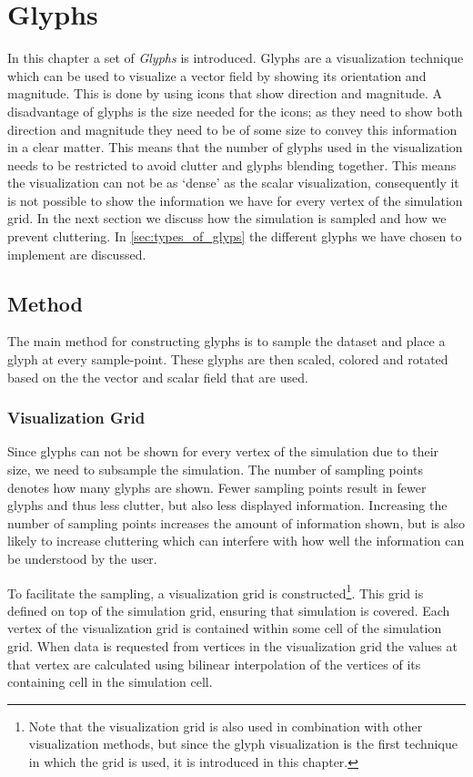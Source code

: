 \chapter{Glyphs} %
\label{cha:glyphs}
In this chapter a set of \emph{Glyphs} is introduced. Glyphs are a visualization technique which can be used to visualize a vector field by showing its orientation and magnitude. This is done by using icons that show direction and magnitude. A disadvantage of glyphs is the size needed for the icons; as they need to show both direction and magnitude they need to be of some size to convey this information in a clear matter. This means that the number of glyphs used in the visualization needs to be restricted to avoid clutter and glyphs blending together. This means the visualization can not be as `dense' as the scalar visualization, consequently it is not possible to show the information we have for every vertex of the simulation grid. In the next section we discuss how the simulation is sampled and how we prevent cluttering. In \cref{sec:types_of_glyps} the different glyphs we have chosen to implement are discussed.

\section{Method} %
\label{sec:method}
The main method for constructing glyphs is to sample the dataset and place a glyph at every sample-point. These glyphs are then scaled, colored and rotated based on the the vector and scalar field that are used.

\subsection{Visualization Grid} %
\label{sub:sampling_grid}
Since glyphs can not be shown for every vertex of the simulation due to their size, we need to subsample the simulation. The number of sampling points denotes how many glyphs are shown. Fewer sampling points result in fewer glyphs and thus less clutter, but also less displayed information. Increasing the number of sampling points increases the amount of information shown, but is also likely to increase cluttering which can interfere with how well the information can be understood by the user. 

To facilitate the sampling, a visualization grid is constructed\footnote{Note that the visualization grid is also used in combination with other visualization methods, but since the glyph visualization is the first technique in which the grid is used, it is introduced in this chapter.}. This grid is defined on top of the simulation grid, ensuring that simulation is covered. Each vertex of the visualization grid is contained within some cell of the simulation grid. When data is requested from vertices in the visualization grid the values at that vertex are calculated using bilinear interpolation of the vertices of its containing cell in the simulation cell. 

